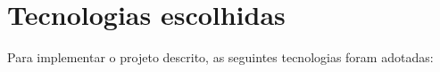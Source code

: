 \chapter{Tecnologias escolhidas}


Para implementar o projeto descrito, as seguintes tecnologias foram adotadas:

